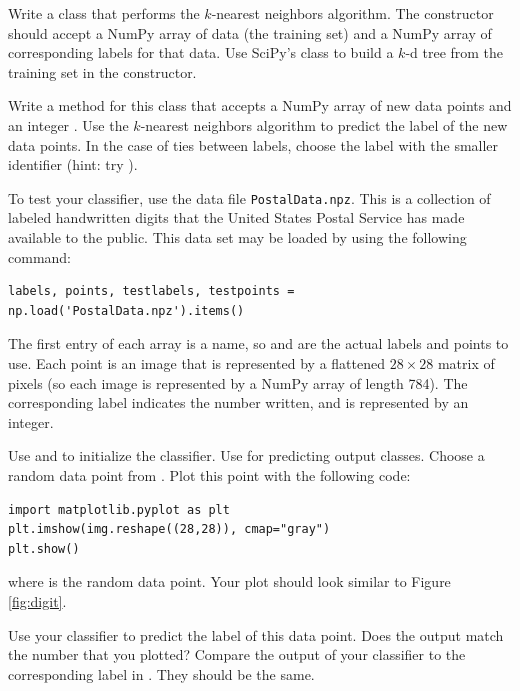 \begin{problem} %
Write a class that performs the $k$-nearest neighbors algorithm. The constructor should accept a NumPy array of data (the training set) and a NumPy array of corresponding labels for that data. Use SciPy's  class to build a $k$-d tree from the training set in the constructor.

Write a method for this class that accepts a NumPy array of new data points and an integer . Use the $k$-nearest neighbors algorithm to predict the label of the new data points. In the case of ties between labels, choose the label with the smaller identifier (hint: try ).

To test your classifier, use the data file \texttt{PostalData.npz}. This is a collection of labeled handwritten digits that the United States Postal Service has made available to the public. This data set may be loaded by using the following command:
\begin{lstlisting}
labels, points, testlabels, testpoints = np.load('PostalData.npz').items()
\end{lstlisting}

The first entry of each array is a name, so  and  are the actual labels and points to use.
Each point is an image that is represented by a flattened $28 \times 28$ matrix of pixels (so each image is represented by a NumPy array of length 784).
The corresponding label indicates the number written, and is represented by an integer.

Use  and  to initialize the classifier. Use  for predicting output classes. Choose a random data point from . Plot this point with the following code:
\begin{lstlisting}
import matplotlib.pyplot as plt
plt.imshow(img.reshape((28,28)), cmap="gray")
plt.show()
\end{lstlisting}
where  is the random data point. Your plot should look similar to Figure \ref{fig:digit}.

Use your classifier to predict the label of this data point. Does the output match the number that you plotted? Compare the output of your classifier to the corresponding label in . They should be the same.



\end{problem}
